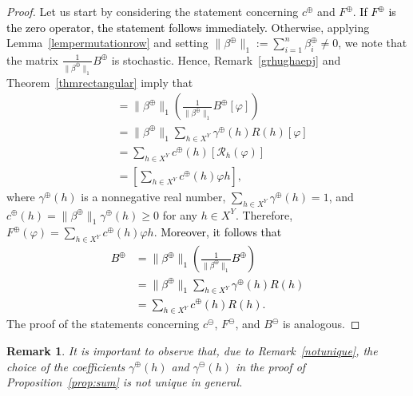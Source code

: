 \documentclass[11pt]{article}
\newcommand{\patrizio}[1]{\textcolor{purple}{#1}}
\newtheorem{rem}[theorem]{Remark}
\begin{document}
\begin{proof}
    Let us start by considering the statement concerning $c^\oplus$ and $F^\oplus$. \textcolor{black}{If $F^\oplus$ is the zero operator, the statement follows immediately.} {\color{black} Otherwise, applying Lemma~\ref{lempermutationrow} and setting $\lVert \beta^\oplus\rVert_1:= \sum_{i=1}^n \beta^\oplus_i\neq 0$}, we note that the matrix $\frac{1}{\lVert \beta^\oplus\rVert_1} B^\oplus$ is stochastic. 
    Hence, Remark~\ref{grhughaepj} and Theorem~\ref{thmrectangular} imply that
    \begin{align*}
    [F^\oplus(\varphi)] & = \lVert \beta^\oplus\rVert_1 \left( \frac{1}{\lVert \beta^\oplus\rVert_1}B^\oplus [\varphi]\right) \\
    & = \lVert \beta^\oplus\rVert_1 \sum_{h \in X^Y}\gamma^\oplus (h)R(h)[\varphi] \\
    & = \sum_{h \in X^Y} c^\oplus(h) [\mathcal{R}_h (\varphi)] \\
    & = \left[\sum_{h \in X^Y} c^\oplus(h) \varphi h\right],
    \end{align*}
    where $\gamma^\oplus(h)$ is a nonnegative real number, $\sum_{h \in X^Y}\gamma^\oplus(h) = 1$, and $c^\oplus(h)= \lVert\beta^\oplus\rVert_1 \gamma^\oplus(h)\ge 0$ for any $h \in X^Y$.
    {\color{black} Therefore, $F^\oplus(\varphi)=\sum_{h \in X^Y} c^\oplus(h) \varphi h$.}
    \textcolor{black}{
    Moreover, it follows that
    \begin{align*}
    B^\oplus & = \lVert \beta^\oplus\rVert_1 \left( \frac{1}{\lVert \beta^\oplus\rVert_1}B^\oplus \right) \\
    & = \lVert \beta^\oplus\rVert_1 \sum_{h \in X^Y}\gamma^\oplus (h)R(h) \\
    & = \sum_{h \in X^Y} c^\oplus(h) R(h).
    \end{align*}
    }
    The proof of the statements concerning $c^\ominus$, $F^\ominus$, and $B^\ominus$ is analogous.
\end{proof}

\begin{rem}\label{gammanotunique}
It is important to observe that, due to Remark~\ref{notunique}, the choice of the
coefficients $\gamma^\oplus(h)$ and $\gamma^\ominus(h)$ in the proof of
Proposition~\ref{prop:sum} is not unique in general.
\end{rem}
\end{document}

